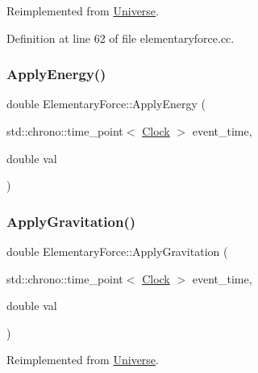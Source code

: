 Reimplemented from \mbox{\hyperlink{class_universe_a4c36c1ab30db993307f88363dde5e8c5}{Universe}}.



Definition at line 62 of file elementaryforce.\+cc.

\mbox{\label{class_elementary_force_a0961328b260cb4dfb2ba54f4e284f0e8}} 
\subsubsection{\texorpdfstring{Apply\+Energy()}{ApplyEnergy()}}
{\footnotesize\ttfamily double Elementary\+Force\+::\+Apply\+Energy (\begin{DoxyParamCaption}\item[{std\+::chrono\+::time\+\_\+point$<$ \mbox{\hyperlink{universe_8h_a0ef8d951d1ca5ab3cfaf7ab4c7a6fd80}{Clock}} $>$}]{event\+\_\+time,  }\item[{double}]{val }\end{DoxyParamCaption})}

\mbox{\label{class_elementary_force_a655a2c9489bfbbf15e05ba4953628134}} 
\subsubsection{\texorpdfstring{Apply\+Gravitation()}{ApplyGravitation()}}
{\footnotesize\ttfamily double Elementary\+Force\+::\+Apply\+Gravitation (\begin{DoxyParamCaption}\item[{std\+::chrono\+::time\+\_\+point$<$ \mbox{\hyperlink{universe_8h_a0ef8d951d1ca5ab3cfaf7ab4c7a6fd80}{Clock}} $>$}]{event\+\_\+time,  }\item[{double}]{val }\end{DoxyParamCaption})\hspace{0.3cm}{\ttfamily [virtual]}}



Reimplemented from \mbox{\hyperlink{class_universe_a76c0b5e63c2a7d1988c44db341c3d64c}{Universe}}.



